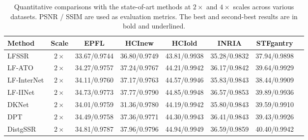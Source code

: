 \begin{table*}[t!]
    \caption{Quantitative comparisons with the state-of-art methods at $2 \times$ and $4 \times$ scales across various datasets. PSNR / SSIM are used as evaluation metrics. The best and second-best results are in bold and underlined.}
    \label{tab:overall}
    \centering
    \begin{tabular}{|l|c|c|c|c|c|c|c|}
    \hline
    Method & Scale & EPFL & HCInew & HCIold & INRIA & STFgantry \\
    \hline
    LFSSR \cite{yeungSAS_LFSR2019}	            & $2\times$ & 33.67/0.9744                          & 36.80/0.9749                          & 43.81/0.9938                              & 35.28/0.9832                            &	37.94/0.9898                            \\
    LF-ATO \cite{jinLFSSRATO_2020}	            & $2\times$ & 34.27/0.9757                          & 37.24/0.9767                          & 44.21/0.9942                              & 36.17/0.9842                            &	39.64/0.9929                            \\
    LF-InterNet \cite{wangLfInterNet_ECCV2020}	& $2\times$ & 34.11/0.9760                          & 37.17/0.9763                          & 44.57/0.9946                              & 35.83/0.9843                            &	38.44/0.9909                            \\
    LF-IINet \cite{liuLFIINet_TMM2021}	        & $2\times$ & 34.73/0.9773                          & 37.77/0.9790                          & 44.85/0.9948                              & 36.57/0.9853                            &	39.89/0.9936                            \\
    DKNet \cite{huDKNet_TIM2022}                & $2\times$ & 34.01/0.9759                          & 31.36/0.9780                          & 44.19/0.9942                              & 35.80/0.9843                            & 39.59/0.9910                            \\
    DPT	\cite{wangDPT_AAAI2022}                 & $2\times$ & 34.49/0.9758                          & 37.36/0.9771                          & 44.30/0.9943                              & 36.41/0.9843                            &	39.43/0.9926                            \\
    DistgSSR \cite{wangDistgSSR_TIP2022}	    & $2\times$ & 34.81/0.9787                          & 37.96/0.9796                          & 44.94/0.9949                              & 36.59/0.9859                            &	40.40/0.9942                            \\

\end{tabular}
\end{table*}
